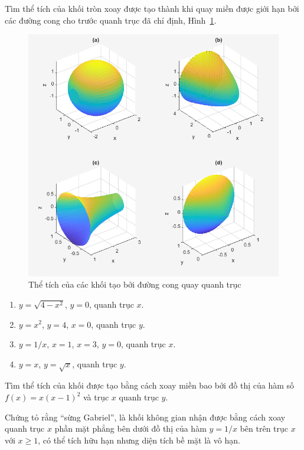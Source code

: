 \begin{exercise}
    Tìm thể tích của khối tròn xoay được tạo thành khi quay miền được giới hạn bởi các đường cong cho trước quanh trục đã chỉ định, Hình~\ref{fig:volumn_solid_revolution}.
    
    \begin{figure}[H]
        \centering
        \includegraphics[width=0.8\linewidth]{figures/volumn_solid_revolution.png}
        \caption{Thể tích của các khối tạo bởi đường cong quay quanh trục}
        \label{fig:volumn_solid_revolution}
    \end{figure}
    
    \begin{enumerate}[label=(\alph*)]
        \item $y = \sqrt{4-x^2}$, $y=0$, quanh trục $x$.
        \item $y = x^2$, $y=4$, $x=0$, quanh trục $y$.
        \item $y = 1/x$, $x=1$, $x=3$, $y=0$, quanh trục $x$.
        \item $y = x$, $y = \sqrt{x}$, quanh trục $y$.
    \end{enumerate}
\end{exercise}

\begin{exercise}
    Tìm thể tích của khối được tạo bằng cách xoay miền bao bởi đồ thị của hàm số $f(x) = x(x-1)^2$ và trục $x$ quanh trục $y$.
\end{exercise}

\begin{exercise}
    Chứng tỏ rằng ``sừng Gabriel'', là khối không gian nhận được bằng cách xoay quanh trục $x$ phần mặt phẳng bên dưới đồ thị của hàm $y = 1/x$ bên trên trục $x$ với $x \ge 1$, có thể tích hữu hạn nhưng diện tích bề mặt là vô hạn.
\end{exercise}

